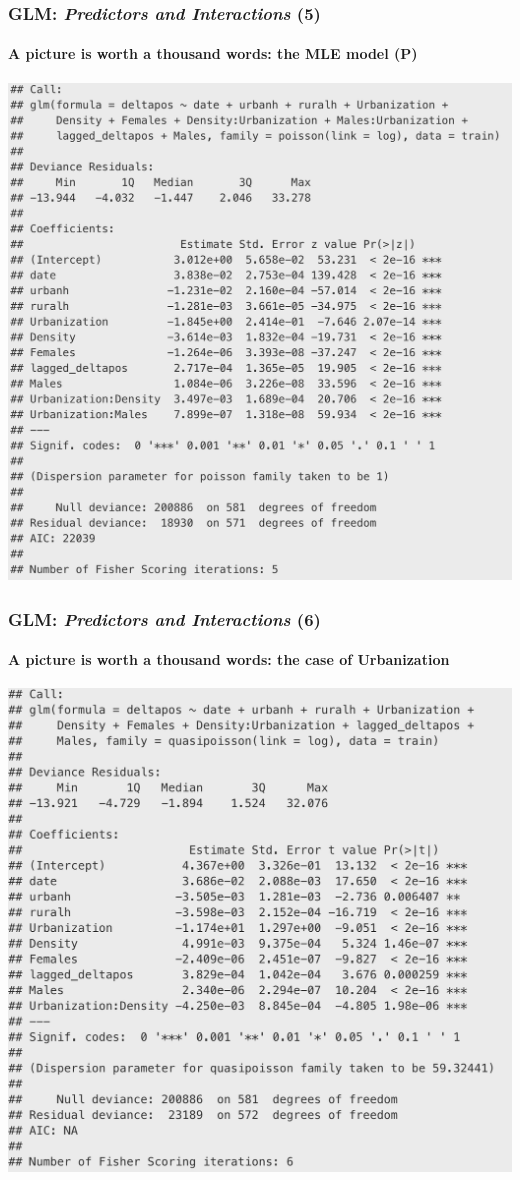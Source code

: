 \documentclass{beamer}
\begin{document}
{\begin{frame}
\end{frame}
\begin{frame}
	\frametitle{GLM: \textit{Predictors and Interactions} (5)}
	\framesubtitle{A picture is worth a thousand words: the MLE model (P)}
		\center \includegraphics[scale = 0.3]{summary_poisson.png}
	\end{frame}
\begin{frame}
	\frametitle{GLM: \textit{Predictors and Interactions} (6)}
	\framesubtitle{A picture is worth a thousand words: the case of \textsf{Urbanization}}
	\center \includegraphics[scale = 0.38]{summary_qpoisson_urb.png}
\end{frame}
\begin{frame}[t]


\end{frame}}
\end{document}
